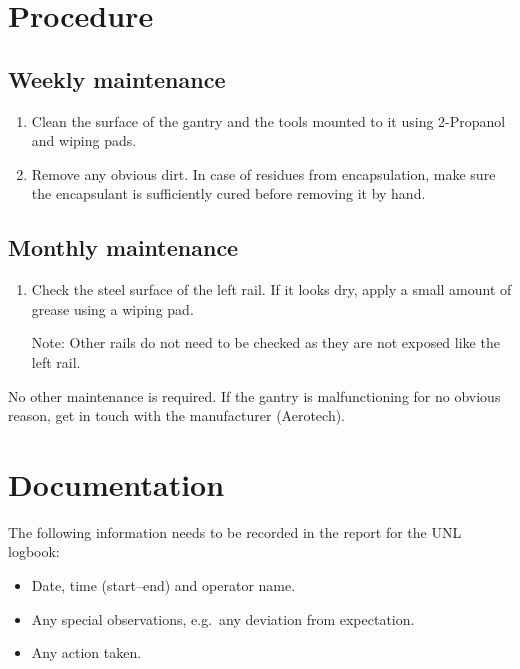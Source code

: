 \documentclass[12pt]{unlsilabsop}
\begin{document}

\section{Procedure}

\subsection{Weekly maintenance}
\begin{enumerate}
    \item Clean the surface of the gantry and the tools mounted to it using 2-Propanol and wiping pads.
    \item Remove any obvious dirt. In case of residues from encapsulation, make sure the encapsulant is sufficiently cured before removing it by hand.
\end{enumerate}

\subsection{Monthly maintenance}
\begin{enumerate}
    \item Check the steel surface of the left rail. If it looks dry, apply a small amount of grease using a wiping pad.

    Note: Other rails do not need to be checked as they are not exposed like the left rail.
\end{enumerate}
No other maintenance is required. If the gantry is malfunctioning for no obvious reason, get in touch with the manufacturer (Aerotech).

\section{Documentation}
The following information needs to be recorded in the report for the UNL logbook:
\begin{itemize}
    \item Date, time (start--end) and operator name.
    \item Any special observations, e.g.~any deviation from expectation.
    \item Any action taken.
\end{itemize}
\end{document}
